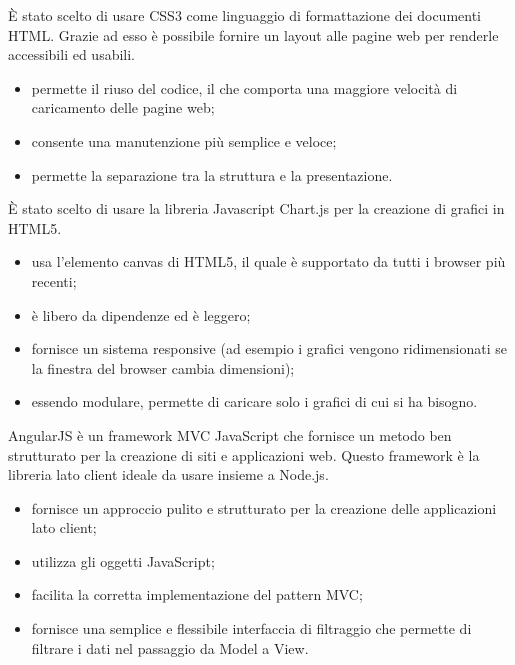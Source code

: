 È stato scelto di usare CSS3 come linguaggio di formattazione dei documenti HTML. Grazie ad esso è possibile fornire un layout alle pagine web per renderle accessibili ed usabili.
\begin{itemize}
\item permette il riuso del codice, il che comporta una maggiore velocità di caricamento delle pagine web;
\item consente una manutenzione più semplice e veloce;
\item permette la separazione tra la struttura e la presentazione.
\end{itemize}

È stato scelto di usare la libreria Javascript Chart.js per la creazione di grafici in HTML5.
\begin{itemize}
\item usa l'elemento canvas di HTML5, il quale è supportato da tutti i browser più recenti;
\item è libero da dipendenze ed è leggero;
\item fornisce un sistema responsive (ad esempio i grafici vengono ridimensionati se la finestra del browser cambia dimensioni);
\item essendo modulare, permette di caricare solo i grafici di cui si ha bisogno.
\end{itemize}

AngularJS è un framework MVC JavaScript che fornisce un metodo ben strutturato per la creazione di siti e applicazioni web. Questo framework è la libreria lato client ideale da usare insieme a Node.js.
\begin{itemize}
\item fornisce un approccio pulito e strutturato per la creazione delle applicazioni lato client;
\item utilizza gli oggetti JavaScript;
\item facilita la corretta implementazione del pattern MVC;
\item fornisce una semplice e flessibile interfaccia di filtraggio che permette di filtrare i dati nel passaggio da Model a View.
\end{itemize}